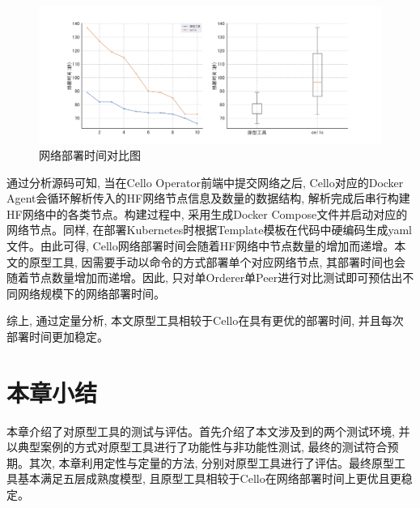 \begin{figure}[h] %
    \centering %
    \includegraphics[width=1.0\textwidth]{FIGs/chapter5/plt_deployment.png} %
    \caption{网络部署时间对比图} %
    \label{plt_deployment} %
\end{figure}%

通过分析源码\footnotemark[1]可知, 当在Cello Operator前端中提交网络之后, Cello对应的Docker Agent会循环解析传入的HF网络节点信息及数量的数据结构, 解析完成后串行构建HF网络中的各类节点。构建过程中, 采用生成Docker Compose文件并启动对应的网络节点。同样, 在部署Kubernetes时根据Template模板在代码中硬编码生成yaml文件。由此可得, Cello网络部署时间会随着HF网络中节点数量的增加而递增。本文的原型工具, 因需要手动以命令的方式部署单个对应网络节点, 其部署时间也会随着节点数量增加而递增。因此, 只对单Orderer单Peer进行对比测试即可预估出不同网络规模下的网络部署时间。

综上, 通过定量分析, 本文原型工具相较于Cello在具有更优的部署时间, 并且每次部署时间更加稳定。


\section{本章小结}

本章介绍了对原型工具的测试与评估。首先介绍了本文涉及到的两个测试环境, 并以典型案例的方式对原型工具进行了功能性与非功能性测试, 最终的测试符合预期。其次, 本章利用定性与定量的方法, 分别对原型工具进行了评估。最终原型工具基本满足五层成熟度模型, 且原型工具相较于Cello在网络部署时间上更优且更稳定。
